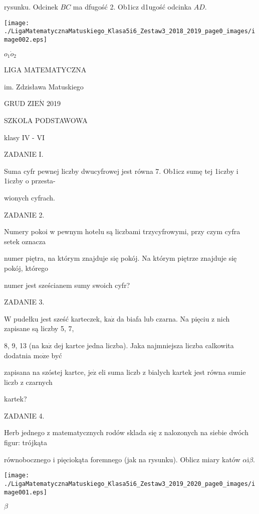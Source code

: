 \documentclass[a4paper,12pt]{article}
\begin{document}
rysunku. Odcinek $BC$ ma dfugość 2. Ob1icz d1ugość odcinka $AD.$
\begin{center}
\texttt{[image: ./LigaMatematycznaMatuskiego\_Klasa5i6\_Zestaw3\_2018\_2019\_page0\_images/image002.eps]}
\end{center}
$o_{1}  \dot{o}_{2}$






LIGA MATEMATYCZNA

im. Zdzisława Matuskiego

GRUD Z$\mathrm{I}\mathrm{E}\acute{\mathrm{N}}$ 2019

SZKOLA PODSTAWOWA

klasy IV - VI

ZADANIE I.

Suma cyfr pewnej liczby dwucyfrowej jest równa 7. Ob1icz sumę tej 1iczby i 1iczby o przesta-

wionych cyfrach.

ZADANIE 2.

Numery pokoi w pewnym hotelu są liczbami trzycyfrowymi, przy czym cyfra setek oznacza

numer piętra, na którym znajduje się pokój. Na którym piętrze znajduje się pokój, którego

numer jest sześcianem sumy swoich cyfr?

ZADANIE 3.

$\mathrm{W}$ pudełku jest sześć karteczek, $\mathrm{k}\mathrm{a}\dot{\mathrm{z}}$ da biafa lub czarna. Na pięciu z nich zapisane są liczby 5, 7,

8, 9, 13 (na $\mathrm{k}\mathrm{a}\dot{\mathrm{z}}$ dej kartce jedna liczba). Jaka najmniejsza liczba calkowita dodatnia $\mathrm{m}\mathrm{o}\dot{\mathrm{z}}\mathrm{e}$ być

zapisana na szóstej kartce, $\mathrm{j}\mathrm{e}\dot{\mathrm{z}}$ eli suma liczb z bialych kartek jest równa sumie liczb z czarnych

kartek?

ZADANIE 4.

Herb jednego z matematycznych rodów sklada się z nalozonych na siebie dwóch figur: trójkąta

równobocznego i pięciokąta foremnego (jak na rysunku). Oblicz miary katów $\alpha \mathrm{i}\beta.$
\begin{center}
\texttt{[image: ./LigaMatematycznaMatuskiego\_Klasa5i6\_Zestaw3\_2019\_2020\_page0\_images/image001.eps]}
\end{center}
$\beta$
\end{document}
